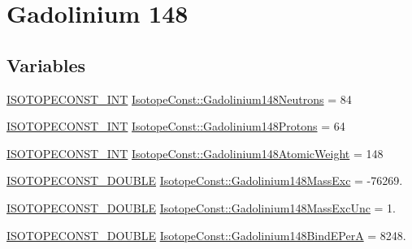 \hypertarget{group___isotope_const-_gadolinium-_gd148}{}\section{Gadolinium 148}
\label{group___isotope_const-_gadolinium-_gd148}
\subsection*{Variables}
\begin{DoxyCompactItemize}
\item 
\mbox{\hyperlink{group___isotope_const-_macros_ga5f18360b3e99483a35c32d789e62621c}{I\+S\+O\+T\+O\+P\+E\+C\+O\+N\+S\+T\+\_\+\+I\+NT}} \mbox{\hyperlink{group___isotope_const-_gadolinium-_gd148_ga9bcb31fbf992c22aadc687a11eb73223}{Isotope\+Const\+::\+Gadolinium148\+Neutrons}} = 84
\item 
\mbox{\hyperlink{group___isotope_const-_macros_ga5f18360b3e99483a35c32d789e62621c}{I\+S\+O\+T\+O\+P\+E\+C\+O\+N\+S\+T\+\_\+\+I\+NT}} \mbox{\hyperlink{group___isotope_const-_gadolinium-_gd148_ga6fc5c28b27430aca9d94c29558253c90}{Isotope\+Const\+::\+Gadolinium148\+Protons}} = 64
\item 
\mbox{\hyperlink{group___isotope_const-_macros_ga5f18360b3e99483a35c32d789e62621c}{I\+S\+O\+T\+O\+P\+E\+C\+O\+N\+S\+T\+\_\+\+I\+NT}} \mbox{\hyperlink{group___isotope_const-_gadolinium-_gd148_ga82ab890e663f41cde37dcb2d9281f8b8}{Isotope\+Const\+::\+Gadolinium148\+Atomic\+Weight}} = 148
\item 
\mbox{\hyperlink{group___isotope_const-_macros_ga8f45a7272ce02c0b4c65c44636ed719a}{I\+S\+O\+T\+O\+P\+E\+C\+O\+N\+S\+T\+\_\+\+D\+O\+U\+B\+LE}} \mbox{\hyperlink{group___isotope_const-_gadolinium-_gd148_gabfb06712b2a62499b42a3c1f99749a0a}{Isotope\+Const\+::\+Gadolinium148\+Mass\+Exc}} = -\/76269.
\item 
\mbox{\hyperlink{group___isotope_const-_macros_ga8f45a7272ce02c0b4c65c44636ed719a}{I\+S\+O\+T\+O\+P\+E\+C\+O\+N\+S\+T\+\_\+\+D\+O\+U\+B\+LE}} \mbox{\hyperlink{group___isotope_const-_gadolinium-_gd148_gac7e19252ba81d683f81c8f9f6f22a0c8}{Isotope\+Const\+::\+Gadolinium148\+Mass\+Exc\+Unc}} = 1.
\item 
\mbox{\hyperlink{group___isotope_const-_macros_ga8f45a7272ce02c0b4c65c44636ed719a}{I\+S\+O\+T\+O\+P\+E\+C\+O\+N\+S\+T\+\_\+\+D\+O\+U\+B\+LE}} \mbox{\hyperlink{group___isotope_const-_gadolinium-_gd148_gaf20c746860ee48cc1c84a5becf6be339}{Isotope\+Const\+::\+Gadolinium148\+Bind\+E\+PerA}} = 8248.

\end{DoxyCompactItemize}
